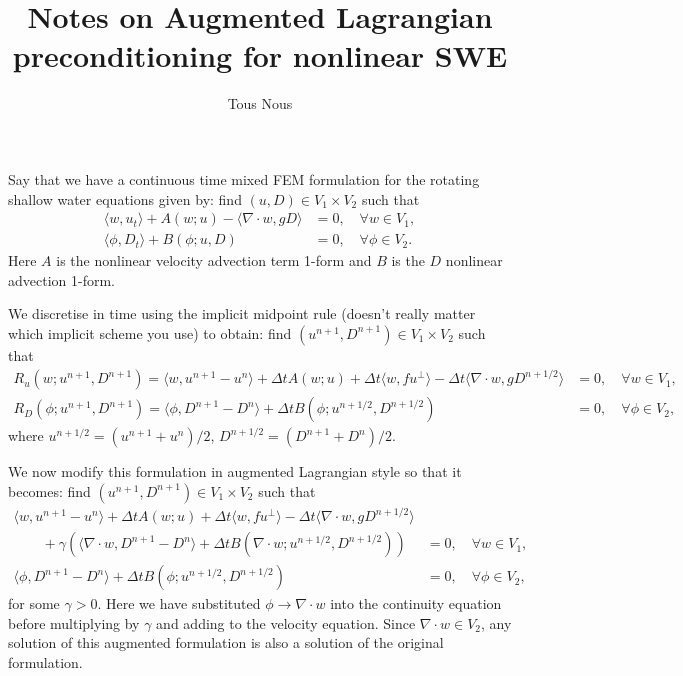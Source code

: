 \documentclass{article}
\begin{document}
\title{Notes on Augmented Lagrangian preconditioning for nonlinear SWE}
\author{Tous Nous}
\maketitle

Say that we have a continuous time mixed FEM formulation for the
rotating shallow water equations given by:
find $(u,D)\in V_1\times V_2$ such that
\begin{align}
  \langle w, u_t \rangle + A(w; u) - \langle \nabla\cdot w, gD\rangle
  & = 0, \quad \forall w \in V_1, \\
  \langle \phi, D_t \rangle + B(\phi; u, D) & = 0, \quad \forall \phi\in V_2.
\end{align}
Here $A$ is the nonlinear velocity advection term 1-form and $B$ is
the $D$ nonlinear advection 1-form.

We discretise in time using the implicit midpoint rule (doesn't really matter
which implicit scheme you use) to obtain: find $(u^{n+1},D^{n+1})
\in V_1\times V_2$ such that
\begin{align}
  R_u(w;u^{n+1},D^{n+1}) = \langle w, u^{n+1}-u^n \rangle + \Delta t A(w; u)
  + \Delta t\langle w, fu^{\perp}\rangle
  - \Delta t\langle \nabla\cdot w, gD^{n+1/2}\rangle
  & = 0, \quad \forall w \in V_1, \\
  R_D(\phi; u^{n+1},D^{n+1}) = \langle \phi, D^{n+1} - D^n \rangle
  + \Delta t B(\phi; u^{n+1/2},D^{n+1/2}) & = 0, \quad \forall \phi\in V_2,
\end{align}
where $u^{n+1/2} = (u^{n+1}+u^n)/2$, $D^{n+1/2}=(D^{n+1}+D^n)/2$.

We now modify this formulation in augmented Lagrangian style so that
it becomes: find $(u^{n+1},D^{n+1}) \in V_1\times V_2$ such that
\begin{align}
  \nonumber
  \langle w, u^{n+1}-u^n \rangle + \Delta t A(w; u)
  + \Delta t\langle w, fu^{\perp}\rangle
  - \Delta t\langle \nabla\cdot w, gD^{n+1/2}\rangle & \\
  \qquad + \gamma\left(
  \langle \nabla\cdot w, D^{n+1} - D^n \rangle
  + \Delta t B(\nabla\cdot w; u^{n+1/2},D^{n+1/2})
  \right)
  & = 0, \quad \forall w \in V_1, \\
  \langle \phi, D^{n+1} - D^n \rangle
  + \Delta t B(\phi; u^{n+1/2},D^{n+1/2}) & = 0, \quad \forall \phi\in V_2,
\end{align}
for some $\gamma>0$.  Here we have substituted $\phi\to \nabla\cdot w$
into the continuity equation before multiplying by $\gamma$ and adding
to the velocity equation. Since $\nabla\cdot w\in V_2$, any solution
of this augmented formulation is also a solution of the original
formulation.
\end{document}
